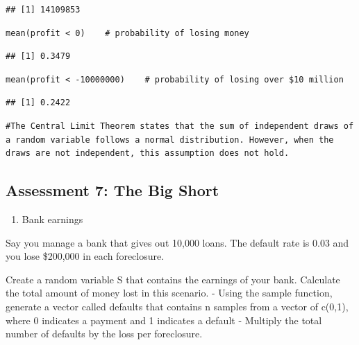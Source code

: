 \documentclass[
]{article}
\providecommand{\tightlist}{%
  \setlength{\itemsep}{0pt}\setlength{\parskip}{0pt}}
\begin{document}
\begin{verbatim}
## [1] 14109853
\end{verbatim}

\begin{verbatim}
mean(profit < 0)    # probability of losing money
\end{verbatim}

\begin{verbatim}
## [1] 0.3479
\end{verbatim}

\begin{verbatim}
mean(profit < -10000000)    # probability of losing over $10 million
\end{verbatim}

\begin{verbatim}
## [1] 0.2422
\end{verbatim}

\begin{verbatim}
#The Central Limit Theorem states that the sum of independent draws of a random variable follows a normal distribution. However, when the draws are not independent, this assumption does not hold.
\end{verbatim}

\hypertarget{assessment-7-the-big-short}{%
\subsection{Assessment 7: The Big
Short}\label{assessment-7-the-big-short}}

\begin{enumerate}
\def\labelenumi{\arabic{enumi}.}
\tightlist
\item
  Bank earnings
\end{enumerate}

Say you manage a bank that gives out 10,000 loans. The default rate is
0.03 and you lose \$200,000 in each foreclosure.

Create a random variable S that contains the earnings of your bank.
Calculate the total amount of money lost in this scenario. - Using the
sample function, generate a vector called defaults that contains n
samples from a vector of c(0,1), where 0 indicates a payment and 1
indicates a default - Multiply the total number of defaults by the loss
per foreclosure.
\end{document}
